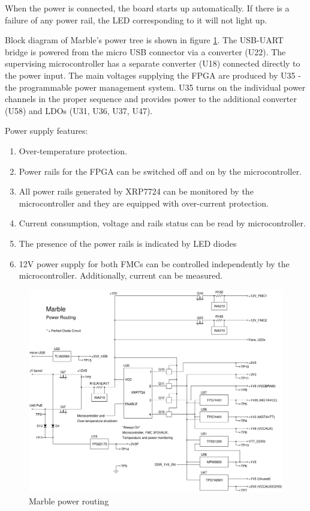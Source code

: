 \documentclass[12pt,oneside,a4]{article}
\begin{document}
When the power is connected, the board starts up automatically. If there is a failure of any power rail, the LED corresponding to it will not light up.

Block diagram of Marble's power tree is shown in figure \ref{pwr}. The USB-UART bridge is powered from the micro USB connector via a converter (U22). The supervising microcontroller has a separate converter (U18) connected directly to the power input. The main voltages supplying the FPGA are produced by U35 - the programmable power management system. U35 turns on the individual power channels in the proper sequence and provides power to the additional converter (U58) and LDOs (U31, U36, U37, U47).

Power supply features:
\begin{enumerate}
	\item Over-temperature protection.
	\item Power rails for the FPGA can be switched off and on by the microcontroller.
	\item All power rails generated by XRP7724 can be monitored by the microcontroller and they are equipped with over-current protection.
	\item Current consumption, voltage and rails status can be read by microcontroller.
	\item The presence of the power rails is indicated by LED diodes
	\item 12V power supply for both FMCs can be controlled independently by the microcontroller. Additionally,  current can be measured.
\end{enumerate}

\begin{figure}[H]
\begin{center}
\includegraphics[width=1.1\linewidth]{m_power.png}
 \caption{Marble power routing}\label{pwr}
\end{center}
\end{figure}
\end{document}
